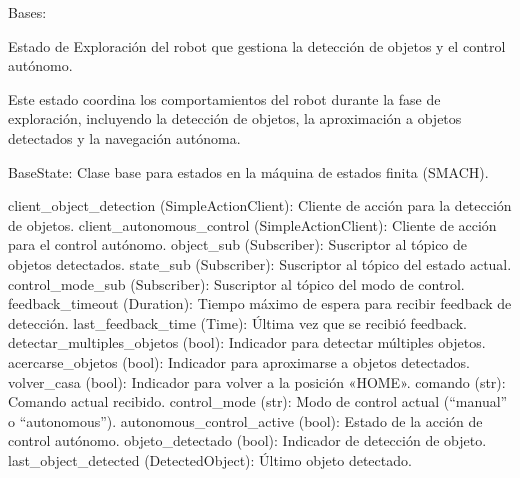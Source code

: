 \documentclass[a4paper,10pt,spanish]{sphinxmanual}
\begin{document}

\begin{fulllineitems}
\label{\detokenize{squad_state_manager:squad_state_manager.EstadoExploracion}}
\pysigstartsignatures
{}
\pysigstopsignatures
\sphinxAtStartPar
Bases: {\hyperref[\detokenize{squad_state_manager:squad_state_manager.BaseState}]{}}

\sphinxAtStartPar
Estado de Exploración del robot que gestiona la detección de objetos y el control autónomo.

\sphinxAtStartPar
Este estado coordina los comportamientos del robot durante la fase de exploración, incluyendo la
detección de objetos, la aproximación a objetos detectados y la navegación autónoma.
\begin{description}
\sphinxAtStartPar
BaseState: Clase base para estados en la máquina de estados finita (SMACH).

\sphinxAtStartPar
client\_object\_detection (SimpleActionClient): Cliente de acción para la detección de objetos.
client\_autonomous\_control (SimpleActionClient): Cliente de acción para el control autónomo.
object\_sub (Subscriber): Suscriptor al tópico de objetos detectados.
state\_sub (Subscriber): Suscriptor al tópico del estado actual.
control\_mode\_sub (Subscriber): Suscriptor al tópico del modo de control.
feedback\_timeout (Duration): Tiempo máximo de espera para recibir feedback de detección.
last\_feedback\_time (Time): Última vez que se recibió feedback.
detectar\_multiples\_objetos (bool): Indicador para detectar múltiples objetos.
acercarse\_objetos (bool): Indicador para aproximarse a objetos detectados.
volver\_casa (bool): Indicador para volver a la posición «HOME».
comando (str): Comando actual recibido.
control\_mode (str): Modo de control actual (“manual” o “autonomous”).
autonomous\_control\_active (bool): Estado de la acción de control autónomo.
objeto\_detectado (bool): Indicador de detección de objeto.
last\_object\_detected (DetectedObject): Último objeto detectado.

\end{description}


\end{fulllineitems}
\end{document}
